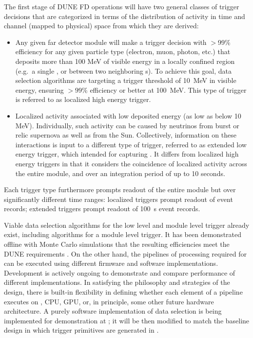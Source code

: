 The first stage of DUNE FD operations will have two general classes of trigger
decisions that are categorized in terms of the distribution of activity
in time and channel (mapped to physical) space from which they are derived: 
\begin{itemize}
\item Any given far detector module will make a 
  trigger decision with $>$99\% efficiency for any given particle
  type (electron, muon, photon, etc.) 
  that deposits more than 100 MeV of visible energy in a locally
  confined region (e.g.~a single , or between two neighboring s). To achieve this
  goal, data selection algorithms are targeting a trigger threshold of
  \SI{10}{\MeV} in visible energy, ensuring $>99$\% efficiency or better
  at \SI{100}{\MeV}. 
  This type of trigger is referred to as localized high
  energy trigger.
\item Localized activity associated with low deposited energy (as low as below 10 MeV). 
  Individually, such activity can be caused by neutrinos from burst or relic supernova as well as from the Sun.
  Collectively, information on these interactions is input to a different type of trigger,
  referred to as extended low energy trigger, which intended for
  capturing .
  It differs from localized high
  energy triggers in that it considers the coincidence of localized
  activity across the entire module, and over an integration period of up to 10
  seconds.
\end{itemize}
Each trigger type furthermore prompts readout
    of the entire module but over significantly different time
    ranges: localized triggers prompt readout of \spreadout event records; extended
    triggers prompt readout of \SI{100}{\second} event records. 

Viable data selection algorithms for the low level and module level trigger already exist, including
algorithms for a module level  trigger.  It has
been demonstrated offline with Monte Carlo simulations that the resulting efficiencies meet the DUNE
requirements \cite{bib:docdb11215}. On the other hand, the pipelines of processing required
for  can be executed using different firmware and software
implementations. Development is actively ongoing to demonstrate
and compare performance of different implementations. In satisfying
the philosophy and strategies of the  design, there is built-in
flexibility in defining whether each element of a pipeline executes on
, CPU, GPU, or, in principle, some other future hardware
architecture. A purely software implementation of data selection is being
implemented for demonstration at ; it will be then modified to match the baseline design in which trigger primitives are generated in .

